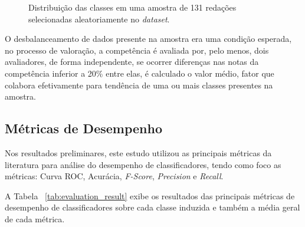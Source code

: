 \begin{figure}[H]
\begin{center}
\caption{Distribuição das classes em uma amostra de 131 redações selecionadas aleatoriamente no \textit{dataset}.}
\label{gra:class_unbundling}
\end{center}
\end{figure}

O desbalanceamento de dados presente na amostra era uma condição esperada, no processo de valoração, a competência é avaliada por, pelo menos, dois avaliadores, de forma independente, se ocorrer diferenças nas notas da competência inferior a 20\% entre elas, é calculado o valor médio, fator que colabora efetivamente para tendência de uma ou mais classes presentes na amostra.

\subsection{Métricas de Desempenho}

Nos resultados preliminares, este estudo utilizou as principais métricas da literatura para análise do desempenho de classificadores, tendo como foco as métricas: Curva ROC, Acurácia, \textit{F-Score}, \textit{Precision} e \textit{Recall}.

A Tabela ~\ref{tab:evaluation_result} exibe os resultados das principais métricas de desempenho de classificadores sobre cada classe induzida e também a média geral de cada métrica.

